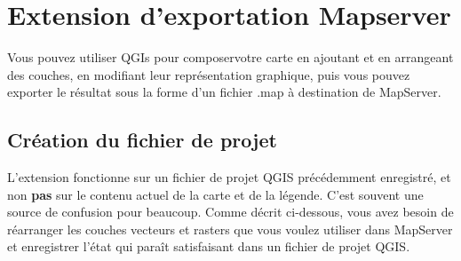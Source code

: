 
\section{Extension d'exportation Mapserver}\label{sec:mapserver_export}



Vous pouvez utiliser QGIs pour \og composer\fg votre carte en ajoutant et en arrangeant des couches, en modifiant leur représentation graphique, puis vous pouvez exporter le résultat sous la forme d'un fichier .map à destination de MapServer.

\subsection{Création du fichier de projet}


L'extension fonctionne sur un fichier de projet QGIS précédemment enregistré, et non 
\textbf{pas} sur le contenu actuel de la carte et de la légende. C'est souvent une source 
de confusion pour beaucoup. Comme décrit ci-dessous, vous avez besoin de réarranger les 
couches vecteurs et rasters que vous voulez utiliser dans MapServer et enregistrer l'état 
qui paraît satisfaisant dans un fichier de projet QGIS.

